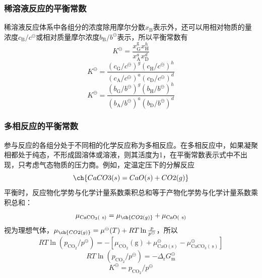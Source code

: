 \begin{frame}
    \frametitle{稀溶液反应的平衡常数}

    \large 稀溶液反应体系中各组分的浓度除用摩尔分数$x_{\mathrm{B}}$表示外，还可以用相对物质的量浓度$c_{\mathrm{B}}/c^\ominus$或相对质量摩尔浓度$b_{\mathrm{B}}/b^\ominus$表示，所以平衡常数有
    \[
        K^{\ominus}=\frac{x_{\mathrm{G}}^{\mathrm{g}} x_{\mathrm{H}}^{h}}{x_{\mathrm{A}}^{a} x_{\mathrm{D}}^{d}}
    \]
    \[
        K^{\ominus} =\frac{(c_{\mathrm{G}} / c^{\ominus})^{g}(c_{\mathrm{H}} / c^{\ominus})^{h}}{(c_{\mathrm{A}} / c^{\ominus})^{a}(c_{\mathrm{D}} / c^{\ominus})^{d}}
    \]
    \[
        K^{\ominus} =\frac{(b_{\mathrm{G}} / b^{\ominus})^{g}(b_{\mathrm{H}} / b^{\ominus})^{h}}{(b_{\mathrm{A}} / b^{\ominus})^{a}(b_{\mathrm{D}} / b^{\ominus})^{d}}
    \]

\end{frame}


\begin{frame}
    \frametitle{多相反应的平衡常数}

    参与反应的各组分处于不同相的化学反应称为多相反应。在多相反应中，如果凝聚相都处于纯态，不形成固溶体或溶液，则其活度为1，在平衡常数表示式中不出现，只考虑气态物质的压力商。例如，定温定压下的分解反应
    \[
        \ch{CaCO3(s) = CaO(s) + CO2(g)}
    \]
    平衡时，反应物化学势与化学计量系数乘积总和等于产物化学势与化学计量系数乘积总和：
    \[
        \mu_{\mathrm{CaCO}_{3}(\mathrm{~s})}=\mu_{\ch{CO2(g)}} + \mu_{\mathrm{CaO}(\mathrm{~s})}
    \]
    视为理想气体，$\mu_{\ch{CO2(g)}} = \mu^{\ominus}(T) + RT\ln \frac{p}{p^{\ominus}}$，所以
    \[
        R T \ln (p_{\mathrm{CO}_{2}} / p^{\ominus})=-[\mu_{\mathrm{CO}_{2}}(\mathrm{g})+\mu_{\mathrm{CaO}(\mathrm{s})}^{\ominus}-\mu_{\mathrm{CaCO}_{3}(\mathrm{~s})}^{\ominus}]
    \]
    \[
        R T \ln (p_{\mathrm{CO}_{2}} / p^{\ominus})=-\Delta_{\mathrm{r}} G_{\mathrm{m}}^{\ominus}
    \]
    \[
        K^{\ominus}=p_{\mathrm{CO}_{2}} / p^{\ominus}
    \]
    \vspace{-7pt}
\end{frame}